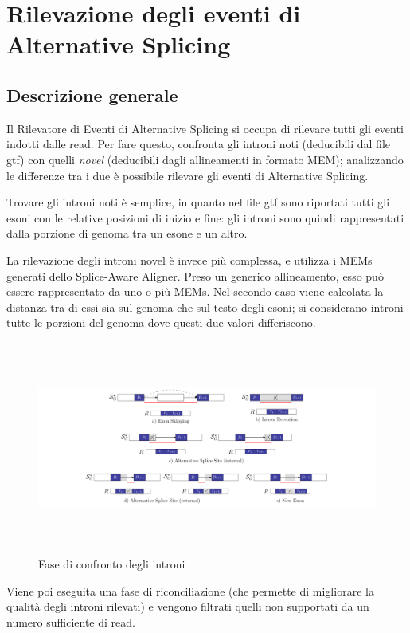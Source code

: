 \section{Rilevazione degli eventi di Alternative Splicing}

\subsection{Descrizione generale}

Il Rilevatore di Eventi di Alternative Splicing si occupa di rilevare tutti gli eventi indotti dalle read. Per fare questo, confronta gli introni noti (deducibili dal file gtf) con quelli \textit{novel} (deducibili dagli allineamenti in formato MEM); analizzando le differenze tra i due è possibile rilevare gli eventi di Alternative Splicing.

Trovare gli introni noti è semplice, in quanto nel file gtf sono riportati tutti gli esoni con le relative posizioni di inizio e fine: gli introni sono quindi rappresentati dalla porzione di genoma tra un esone e un altro. 

La rilevazione degli introni novel è invece più complessa, e utilizza i MEMs generati dello Splice-Aware Aligner. Preso un generico allineamento, esso può essere rappresentato da uno o più MEMs. Nel secondo caso viene calcolata la distanza tra di essi sia sul genoma che sul testo degli esoni; si considerano introni tutte le porzioni del genoma dove questi due valori differiscono.

\begin{figure}[h!]
	\centering
	\includegraphics[width=\linewidth, height=7cm]{images/pattern.png}
  \caption{Fase di confronto degli introni}
  \label{fig:Summary}
\end{figure}

Viene poi eseguita una fase di riconciliazione (che permette di migliorare la qualità degli introni rilevati) e vengono filtrati quelli non supportati da un numero sufficiente di read.


